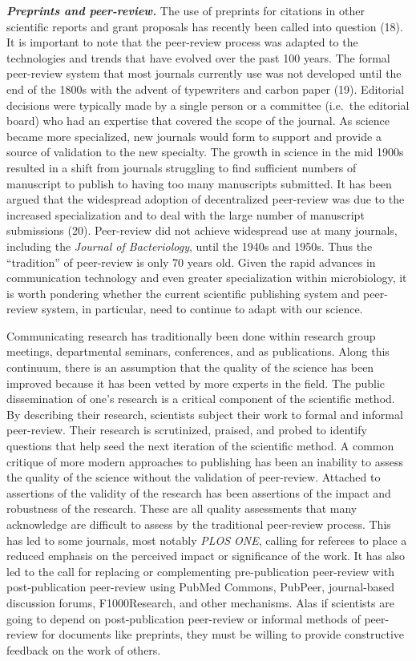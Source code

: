 \documentclass[11pt,]{article}
\begin{document}
\textbf{\emph{Preprints and peer-review.}} The use of preprints for
citations in other scientific reports and grant proposals has recently
been called into question (18). It is important to note that the
peer-review process was adapted to the technologies and trends that have
evolved over the past 100 years. The formal peer-review system that most
journals currently use was not developed until the end of the 1800s with
the advent of typewriters and carbon paper (19). Editorial decisions
were typically made by a single person or a committee (i.e.~the
editorial board) who had an expertise that covered the scope of the
journal. As science became more specialized, new journals would form to
support and provide a source of validation to the new specialty. The
growth in science in the mid 1900s resulted in a shift from journals
struggling to find sufficient numbers of manuscript to publish to having
too many manuscripts submitted. It has been argued that the widespread
adoption of decentralized peer-review was due to the increased
specialization and to deal with the large number of manuscript
submissions (20). Peer-review did not achieve widespread use at many
journals, including the \emph{Journal of Bacteriology}, until the 1940s
and 1950s. Thus the ``tradition'' of peer-review is only 70 years old.
Given the rapid advances in communication technology and even greater
specialization within microbiology, it is worth pondering whether the
current scientific publishing system and peer-review system, in
particular, need to continue to adapt with our science.

Communicating research has traditionally been done within research group
meetings, departmental seminars, conferences, and as publications. Along
this continuum, there is an assumption that the quality of the science
has been improved because it has been vetted by more experts in the
field. The public dissemination of one's research is a critical
component of the scientific method. By describing their research,
scientists subject their work to formal and informal peer-review. Their
research is scrutinized, praised, and probed to identify questions that
help seed the next iteration of the scientific method. A common critique
of more modern approaches to publishing has been an inability to assess
the quality of the science without the validation of peer-review.
Attached to assertions of the validity of the research has been
assertions of the impact and robustness of the research. These are all
quality assessments that many acknowledge are difficult to assess by the
traditional peer-review process. This has led to some journals, most
notably \emph{PLOS ONE}, calling for referees to place a reduced
emphasis on the perceived impact or significance of the work. It has
also led to the call for replacing or complementing pre-publication
peer-review with post-publication peer-review using PubMed Commons,
PubPeer, journal-based discussion forums, F1000Research, and other
mechanisms. Alas if scientists are going to depend on post-publication
peer-review or informal methods of peer-review for documents like
preprints, they must be willing to provide constructive feedback on the
work of others.
\end{document}
